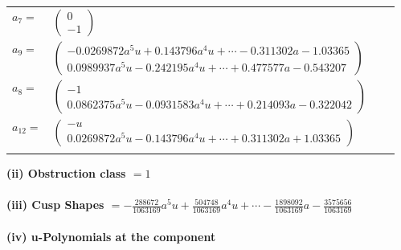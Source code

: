 \documentclass[1p]{elsarticle_modified}
\theoremstyle{definition}
\begin{document}
\begin{tabular}{m{7pt} m{180pt} m{7pt} m{180pt} }
\flushright $a_{7}=$&$\begin{pmatrix}0\\-1\end{pmatrix}$ \\
\flushright $a_{9}=$&$\begin{pmatrix}-0.0269872 a^{5} u+0.143796 a^{4} u+\cdots-0.311302 a-1.03365\\0.0989937 a^{5} u-0.242195 a^{4} u+\cdots+0.477577 a-0.543207\end{pmatrix}$ \\
\flushright $a_{8}=$&$\begin{pmatrix}-1\\0.0862375 a^{5} u-0.0931583 a^{4} u+\cdots+0.214093 a-0.322042\end{pmatrix}$ \\
\flushright $a_{12}=$&$\begin{pmatrix}- u\\0.0269872 a^{5} u-0.143796 a^{4} u+\cdots+0.311302 a+1.03365\end{pmatrix}$\\&\end{tabular}
\flushleft \textbf{(ii) Obstruction class $= 1$}\\~\\
\flushleft \textbf{(iii) Cusp Shapes $= -\frac{288672}{1063169} a^5 u+\frac{504748}{1063169} a^4 u+\cdots-\frac{1898092}{1063169} a-\frac{3575656}{1063169}$}\\~\\
\newpage\renewcommand{\arraystretch}{1}
\flushleft \textbf{(iv) u-Polynomials at the component}\newline \\
\end{document}
